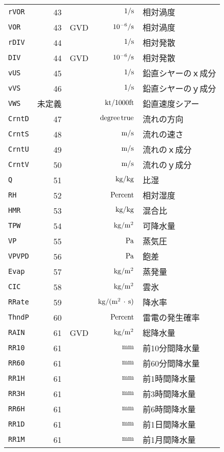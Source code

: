 \begin{longtable}{l|rrrp{}}
{\tt rVOR} & 43 &  & ${\rm\,1/s}$ & 相対渦度 \\
{\tt VOR} & 43 & GVD & ${\rm\,10^{-6}/s}$ & 相対渦度 \\
{\tt rDIV} & 44 &  & ${\rm\,1/s}$ & 相対発散 \\
{\tt DIV} & 44 & GVD & ${\rm\,10^{-6}/s}$ & 相対発散 \\
{\tt vUS} & 45 &  & ${\rm\,1/s}$ & 鉛直シヤーのｘ成分 \\
{\tt vVS} & 46 &  & ${\rm\,1/s}$ & 鉛直シヤーのｙ成分 \\
{\tt VWS} & 未定義 &  & ${\rm\,kt/1000ft}$ & 鉛直速度シアー \\
{\tt CrntD} & 47 &  & ${\rm\,degree\,true}$ & 流れの方向 \\
{\tt CrntS} & 48 &  & ${\rm\,m/s}$ & 流れの速さ \\
{\tt CrntU} & 49 &  & ${\rm\,m/s}$ & 流れのｘ成分 \\
{\tt CrntV} & 50 &  & ${\rm\,m/s}$ & 流れのｙ成分 \\
{\tt Q} & 51 &  & ${\rm\,kg/kg}$ & 比湿 \\
{\tt RH} & 52 &  & ${\rm\,Percent}$ & 相対湿度 \\
{\tt HMR} & 53 &  & ${\rm\,kg/kg}$ & 混合比 \\
{\tt TPW} & 54 &  & ${\rm\,kg/m^2}$ & 可降水量 \\
{\tt VP} & 55 &  & ${\rm\,Pa}$ & 蒸気圧 \\
{\tt VPVPD} & 56 &  & ${\rm\,Pa}$ & 飽差 \\
{\tt Evap} & 57 &  & ${\rm\,kg/m^2}$ & 蒸発量 \\
{\tt CIC} & 58 &  & ${\rm\,kg/m^2}$ & 雲氷 \\
{\tt RRate} & 59 &  & ${\rm\,kg/(m^2\,\cdot\,s)}$ & 降水率 \\
{\tt ThndP} & 60 &  & ${\rm\,Percent}$ & 雷電の発生確率 \\
{\tt RAIN} & 61 & GVD & ${\rm\,kg/m^2}$ & 総降水量 \\
{\tt RR10} & 61 &  & ${\rm\,mm}$ & 前10分間降水量 \\
{\tt RR60} & 61 &  & ${\rm\,mm}$ & 前60分間降水量 \\
{\tt RR1H} & 61 &  & ${\rm\,mm}$ & 前1時間降水量 \\
{\tt RR3H} & 61 &  & ${\rm\,mm}$ & 前3時間降水量 \\
{\tt RR6H} & 61 &  & ${\rm\,mm}$ & 前6時間降水量 \\
{\tt RR1D} & 61 &  & ${\rm\,mm}$ & 前1日間降水量 \\
{\tt RR1M} & 61 &  & ${\rm\,mm}$ & 前1月間降水量 \\

\end{longtable}
